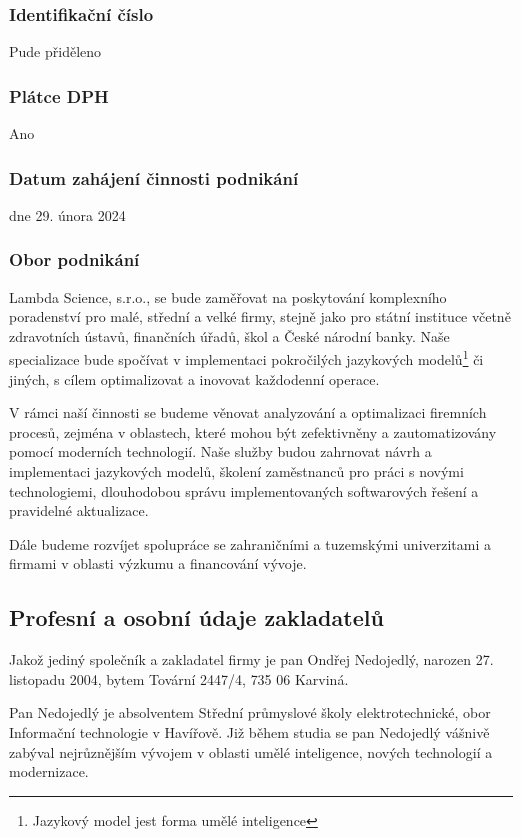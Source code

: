 \documentclass[a4paper,12pt]{report}
\begin{document}
\subsubsection{Identifikační číslo}
Pude přiděleno
\subsubsection{Plátce DPH}
Ano
\subsubsection{Datum zahájení činnosti podnikání}
dne 29. února 2024

\subsubsection{Obor podnikání}                                
Lambda Science, s.r.o., se bude zaměřovat na poskytování komplexního poradenství pro malé, střední a velké firmy,
 stejně jako pro státní instituce včetně zdravotních ústavů, finančních úřadů, škol a České národní banky. Naše 
 specializace bude spočívat v implementaci pokročilých jazykových modelů\footnote{Jazykový model jest forma umělé inteligence} či jiných, s cílem optimalizovat a inovovat každodenní operace.

V rámci naší činnosti se budeme věnovat analyzování a optimalizaci firemních procesů, zejména v oblastech, 
které mohou být zefektivněny a zautomatizovány pomocí moderních technologií. Naše služby budou zahrnovat návrh a implementaci 
jazykových modelů, školení zaměstnanců pro práci s novými technologiemi, dlouhodobou správu implementovaných softwarových řešení
a pravidelné aktualizace.

Dále budeme rozvíjet spolupráce se zahraničními a tuzemskými univerzitami a firmami v oblasti výzkumu a financování vývoje. 

\subsection{Profesní a osobní údaje zakladatelů}

Jakož jediný společník a zakladatel firmy je pan Ondřej Nedojedlý, narozen 27. listopadu 2004, bytem Tovární 2447/4, 735 06 Karviná.

Pan Nedojedlý je absolventem Střední průmyslové školy elektrotechnické, obor Informační technologie v Havířově. Již během studia 
se pan Nedojedlý vášnivě zabýval nejrůznějším vývojem v oblasti umělé inteligence, nových technologií a modernizace.
\end{document}
